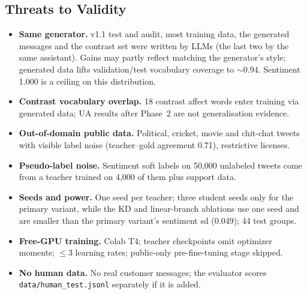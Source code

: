 \documentclass[11pt,a4paper]{article}
\theoremstyle{remark}
\begin{document}
\subsection{Threats to Validity}
\begin{itemize}
  \item \textbf{Same generator.} v1.1 test and audit, most training data, the generated messages and the contrast set were written by LLMs (the last two by the same assistant). Gains may partly reflect matching the generator's style; generated data lifts validation/test vocabulary coverage to $\sim$0.94. Sentiment 1.000 is a ceiling on this distribution.
  \item \textbf{Contrast vocabulary overlap.} 18 contrast affect words enter training via generated data; UA results after Phase~2 are not generalisation evidence.
  \item \textbf{Out-of-domain public data.} Political, cricket, movie and chit-chat tweets with visible label noise (teacher--gold agreement 0.71), restrictive licenses.
  \item \textbf{Pseudo-label noise.} Sentiment soft labels on 50{,}000 unlabeled tweets come from a teacher trained on 4{,}000 of them plus support data.
  \item \textbf{Seeds and power.} One seed per teacher; three student seeds only for the primary variant, while the KD and linear-branch ablations use one seed and are smaller than the primary variant's sentiment sd (0.049); 44 test groups.
  \item \textbf{Free-GPU training.} Colab T4; teacher checkpoints omit optimizer moments; $\le$3 learning rates; public-only pre-fine-tuning stage skipped.
  \item \textbf{No human data.} No real customer messages; the evaluator scores \texttt{data/human\_test.jsonl} separately if it is added.
\end{itemize}
\end{document}
